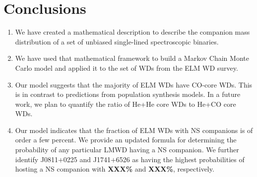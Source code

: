 \documentclass[apjl]{emulateapj}
\newcommand{\Msun}{\ifmmode {{\rm M}_{\odot}}\else M$_{\odot}$\fi}
\begin{document}


\section{Conclusions}

\begin{enumerate}
\item We have created a mathematical description to describe the companion mass distribution of a set of unbiased single-lined spectroscopic binaries. \\
\item We have used that mathematical framework to build a Markov Chain Monte Carlo model and applied it to the set of WDs from the ELM WD survey. \\
\item Our model suggests that the majority of ELM WDs have CO-core WDs. This is in contrast to predictions from population synthesis models. In a future work, we plan to quantify the ratio of He+He core WDs to He+CO core WDs. \\
\item Our model indicates that the fraction of ELM WDs with NS companions is of order a few percent. We provide an updated formula for determining the probability of any particular LMWD having a NS companion. We further identify J0811$+$0225 and J1741$+$6526 as having the highest probabilities of hosting a NS companion with {\bf XXX\%} and {\bf XXX\%}, respectively. \\
\end{enumerate}
\end{document}
